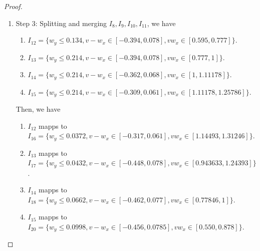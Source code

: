\documentclass{article}
\theoremstyle{plain}
\theoremstyle{remark}
\begin{document}
\begin{proof}
\begin{enumerate}
\begin{enumerate}
\begin{enumerate}
                \item $I_7$ mapps to \\ $I_{11} = \{w_y\le 0.134, v-w_x\in[-0.394, 0.0782], vw_x \in[0.595, 1]\}$.
            \end{enumerate}
        \item Step 3: Splitting and merging $I_8,I_9,I_{10},I_{11}$, we have
            \begin{enumerate}
                \item $I_{12}=\{w_y\le 0.134, v-w_x\in[-0.394, 0.078], vw_x \in[0.595, 0.777]\}$.
                \item $I_{13}=\{w_y\le 0.214, v-w_x\in[-0.394, 0.078], vw_x \in[0.777, 1]\}$.
                \item $I_{14}=\{w_y\le 0.214, v-w_x\in[-0.362, 0.068], vw_x \in[1, 1.11178]\}$.
                \item $I_{15}=\{w_y\le 0.214, v-w_x\in[-0.309, 0.061], vw_x \in[1.11178, 1.25786]\}$.
            \end{enumerate}
            Then, we have 
            \begin{enumerate}
                \item $I_{12}$ mapps to \\ $I_{16} = \{w_y\le 0.0372, v-w_x\in[-0.317, 0.061], vw_x \in[1.14493, 1.31246]\}$.
                \item $I_{13}$ mapps to \\ $I_{17} = \{w_y\le 0.0432, v-w_x\in[-0.448, 0.078], vw_x \in[0.943633, 1.24393]\}$.
                \item $I_{14}$ mapps to \\ $I_{18} = \{w_y\le 0.0662, v-w_x\in[-0.462, 0.077], vw_x \in[0.77846, 1]\}$.
                \item $I_{15}$ mapps to \\ $I_{20} = \{w_y\le 0.0998, v-w_x\in[-0.456, 0.0785], vw_x \in[0.550, 0.878]\}$.
            \end{enumerate}
    \end{enumerate}
    

\end{enumerate}
\end{proof}
\end{document}
